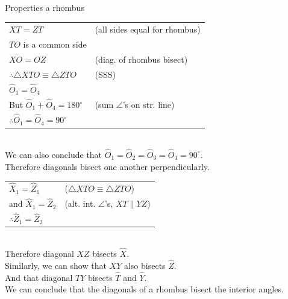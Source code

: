 \begin{wex}{Properties a rhombus}
{}
{
\begin{tabular}{ll}
$XT = ZT$ & (all sides equal for rhombus) \\
$TO$ is a common side & \\
$XO = OZ$ & (diag. of rhombus bisect) \\ 
$\therefore \triangle XTO \equiv \triangle ZTO$ & (SSS) \\
$\hat{O}_1 = \hat{O}_4$ & \\
But $\hat{O}_1 + \hat{O}_4 = 180^\circ$ & (sum $\angle$'s on str. line) \\
$\therefore \hat{O}_1 = \hat{O}_4 = 90^\circ$ & \\
\end{tabular}\\
We can also conclude that $\hat{O}_1 = \hat{O}_2 = \hat{O}_3 = \hat{O}_4 = 90^\circ$. \\
Therefore diagonals bisect one another perpendicularly.
\begin{tabular}{ll}
 $\hat{X}_1 = \hat{Z}_1$ & ($\triangle XTO \equiv \triangle ZTO$) \\
and $\hat{X}_1 = \hat{Z}_2$ & (alt. int. $\angle$'s, $XT \parallel YZ$) \\
$\therefore \hat{Z}_1 = \hat{Z}_2$ & \\
\end{tabular}\\
Therefore diagonal $XZ$ bisects $\hat{X}$. \\
\newline
Similarly, we can show that $XY$ also bisects $\hat{Z}$. \\
And that diagonal $TY$ bisects $\hat{T}$ and $\hat{Y}$. \\ \newline
We can conclude that the diagonals of a rhombus bisect the interior angles.
}
\end{wex}

